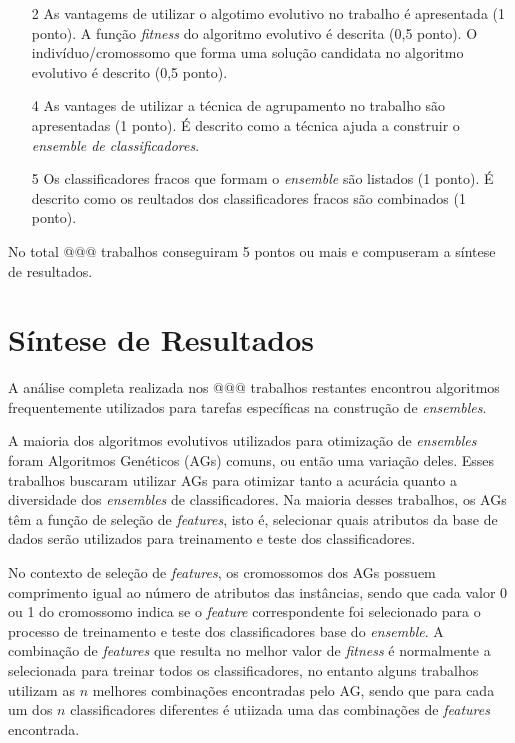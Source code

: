 \documentclass[12pt]{report}
\begin{document}
\begin{enumerate}
  \item[2] As vantagems de utilizar o algotimo evolutivo no trabalho é apresentada (1 ponto). A função \textit{fitness} do algoritmo evolutivo é descrita (0,5 ponto). O indivíduo/cromossomo que forma uma solução candidata no algoritmo evolutivo é descrito (0,5 ponto).
  \item[4] As vantages de utilizar a técnica de agrupamento no trabalho são apresentadas (1 ponto). É descrito como a técnica ajuda a construir o \textit{ensemble de classificadores}.
  \item[5] Os classificadores fracos que formam o \textit{ensemble} são listados (1 ponto). É descrito como os reultados dos classificadores fracos são combinados (1 ponto).
\end{enumerate}

No total @@@ trabalhos conseguiram 5 pontos ou mais e compuseram a síntese de resultados.

\section{Síntese de Resultados} \label{sec:sintese_de_resultados}

A análise completa realizada nos @@@ trabalhos restantes encontrou algoritmos frequentemente utilizados para tarefas específicas na construção de \textit{ensembles}.

A maioria dos algoritmos evolutivos utilizados para otimização de \textit{ensembles} foram Algoritmos Genéticos (AGs) comuns, ou então uma variação deles. Esses trabalhos buscaram utilizar AGs para otimizar tanto a acurácia quanto a diversidade dos \textit{ensembles} de classificadores. Na maioria desses trabalhos, os AGs têm a função de seleção de \textit{features}, isto é, selecionar quais atributos da base de dados serão utilizados para treinamento e teste dos classificadores.

No contexto de seleção de \textit{features}, os cromossomos dos AGs possuem comprimento igual ao número de atributos das instâncias, sendo que cada valor 0 ou 1 do cromossomo indica se o \textit{feature} correspondente foi selecionado para o processo de treinamento e teste dos classificadores base do \textit{ensemble}. A combinação de \textit{features} que resulta no melhor valor de \textit{fitness} é normalmente a selecionada para treinar todos os classificadores, no entanto alguns trabalhos utilizam as $n$ melhores combinações encontradas pelo AG, sendo que para cada um dos $n$ classificadores diferentes é utiizada uma das combinações de \textit{features} encontrada.
\end{document}
